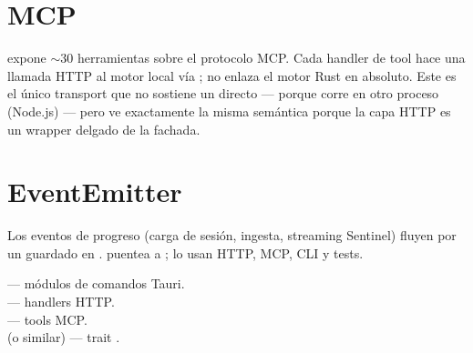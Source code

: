 \section{MCP}

 expone $\sim$30
herramientas sobre el protocolo MCP. Cada handler de tool hace
una llamada HTTP al motor local vía
; no enlaza el motor Rust en
absoluto. Este es el único transport que no sostiene un
 directo --- porque corre en otro
proceso (Node.js) --- pero ve exactamente la misma semántica
porque la capa HTTP es un wrapper delgado de la fachada.

\section{EventEmitter}

Los eventos de progreso (carga de sesión, ingesta, streaming
Sentinel) fluyen por un  guardado en
.  puentea a
;  lo usan HTTP, MCP,
CLI y tests.

\begin{inthecode}
 --- módulos de comandos
Tauri.\\
 --- handlers HTTP.\\
 --- tools MCP.\\
 (o similar) ---
trait .
\end{inthecode}
